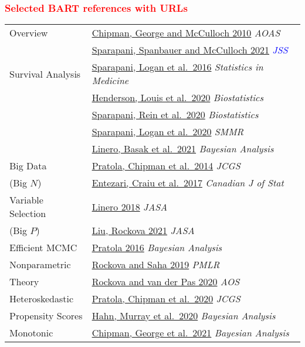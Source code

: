 \documentclass[11pt,dvipsnames,usenames,times]{beamer}
\begin{document}
\begin{frame}[fragile]\frametitle{\bf\textcolor{black}
{\textcolor{red}{Selected BART references with URLs}}}
\begin{tabular}{l|l} \hline
Overview & \href{https://dx.doi.org/10.1214/09-AOAS285} 
{Chipman, George and McCulloch 2010} {\it AOAS} \\
& \textcolor{blue}{\href{https://doi.org/10.18637/jss.v097.i01}
{Sparapani, Spanbauer and McCulloch 2021} {\it JSS}} \\ \hline
Survival Analysis & \href{https://doi.org/10.1002/sim.6893} 
{Sparapani, Logan et al.\ 2016} {\it Statistics in Medicine}\\
& \href{https://doi.org/10.1093/biostatistics/kxy028}
{Henderson, Louis et al.\ 2020} {\it Biostatistics} \\
& \href{https://doi.org/10.1093/biostatistics/kxy032}
{Sparapani, Rein et al.\ 2020} {\it Biostatistics}\\
& \href{https://doi.org/10.1177/0962280218822140}
{Sparapani, Logan et al.\ 2020} {\it SMMR}\\
& \href{https://doi.org/10.1214/21-BA1285}
{Linero, Basak et al.\ 2021} {\it Bayesian Analysis} \\ \hline
Big Data 
& \href{https://doi.org/10.1080/10618600.2013.841584}
{Pratola, Chipman et al.\ 2014} {\it JCGS}\\
(Big $N$) & \href{https://doi.org/10.1002/cjs.11343}
{Entezari, Craiu et al.\ 2017} {\it Canadian J of Stat} \\ \hline
Variable Selection & \href{https://dx.doi.org/10.1080/01621459.2016.1264957}
{Linero 2018} {\it JASA}\\
(Big $P$)& \href{https://doi.org/10.1080/01621459.2021.1928514}
{Liu, Rockova 2021} {\it JASA} \\ \hline
Efficient MCMC & \href{https://dx.doi.org/10.1214/16-BA999}
{Pratola 2016} {\it Bayesian Analysis} \\ \hline
Nonparametric & \href{https://proceedings.mlr.press/v89/rockova19a.html}
{Rockova and Saha 2019} {\it PMLR} \\
Theory & \href{https://dx.doi.org/10.1214/19-AOS1879} 
{Rockova and van der Pas 2020} {\it AOS} \\ \hline
Heteroskedastic & \href{https://dx.doi.org/10.1080/10618600.2019.1677243}
{Pratola, Chipman et al.\ 2020} {\it JCGS} \\ \hline
Propensity Scores & \href{https://doi.org/10.1214/19-BA1195} {Hahn, Murray et al.\ 2020} {\it Bayesian Analysis} \\ \hline
Monotonic & \href{https://doi.org/10.1214/21-BA1259}
{Chipman, George et al.\ 2021} {\it Bayesian Analysis}
\end{tabular}
\end{frame}
\end{document}
